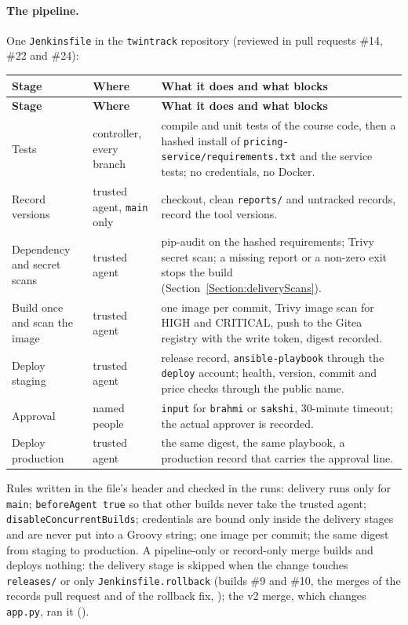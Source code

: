 \paragraph{The pipeline.} One \texttt{Jenkinsfile} in the \texttt{twintrack} repository (reviewed in pull requests \#14, \#22 and \#24):
\begin{tabularx}{\linewidth}{L{3.6cm}L{2.7cm}Y}
\caption{Stages of the delivery pipeline\label{Table:DeliveryStages}}\\
\toprule \textbf{Stage} & \textbf{Where} & \textbf{What it does and what blocks}\\ \midrule
\endfirsthead
\toprule \textbf{Stage} & \textbf{Where} & \textbf{What it does and what blocks}\\ \midrule
\endhead \bottomrule \endlastfoot
Tests & controller, every branch & compile and unit tests of the course code, then a hashed install of \texttt{pricing-service/requirements.txt} and the service tests; no credentials, no Docker.\\
Record versions & trusted agent, \texttt{main} only & checkout, clean \texttt{reports/} and untracked records, record the tool versions.\\
Dependency and secret scans & trusted agent & pip-audit on the hashed requirements; Trivy secret scan; a missing report or a non-zero exit stops the build (Section~\ref{Section:deliveryScans}).\\
Build once and scan the image & trusted agent & one image per commit, Trivy image scan for HIGH and CRITICAL, push to the Gitea registry with the write token, digest recorded.\\
Deploy staging & trusted agent & release record, \texttt{ansible-playbook} through the \texttt{deploy} account; health, version, commit and price checks through the public name.\\
Approval & named people & \texttt{input} for \texttt{brahmi} or \texttt{sakshi}, 30-minute timeout; the actual approver is recorded.\\
Deploy production & trusted agent & the same digest, the same playbook, a production record that carries the approval line.\\
\end{tabularx}

Rules written in the file's header and checked in the runs: delivery runs only for \texttt{main}; \texttt{beforeAgent true} so that other builds never take the trusted agent;
\texttt{disableConcurrentBuilds}; credentials are bound only inside the delivery stages and are never put into a Groovy string; one image per commit; the same digest from staging to production.
A pipeline-only or record-only merge builds and deploys nothing: the delivery stage is skipped when the change touches \texttt{releases/} or only \texttt{Jenkinsfile.rollback} (builds \#9 and \#10, the merges of the records pull request and of the rollback fix, ); the v2 merge, which changes
\texttt{app.py}, ran it ().

